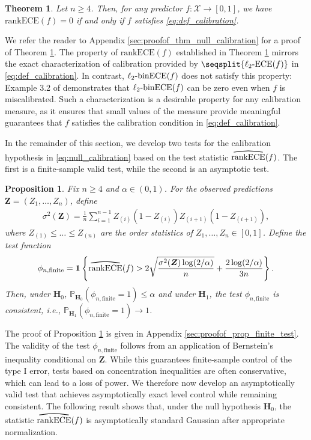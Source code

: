 \documentclass[11pt]{article}
\numberwithin{equation}{section}
\newtheorem{theorem}{Theorem}[section]
\newtheorem{proposition}{Proposition}[section]
\theoremstyle{definition}
\renewcommand{\P}{\mathbb{P}}
\newcommand{\cX}{\mathcal{X}}
\newcommand{\bZ}{\bm{Z}}
\newcommand{\one}{\bm{1}}
\newcommand{\myoverline}[2][3.5em]{%
  \overset{%
    \tikz[baseline=-0.1ex]{
      \draw[line width=0.75pt]
        (0,0) .. controls (#1/2,0.5ex) .. (#1,0);
    }%
  }{#2}%
}
\newcommand{\ECE}{\mathrm{ECE}}
\newcommand{\lECE}{\ell_2\textnormal{-}\ECE}
\newcommand{\binECE}{\mathrm{binECE}}
\newcommand{\lbinECE}{\ell_2\textnormal{-}\binECE}
\newcommand{\rankECE}{\mathrm{rankECE}}
\newcommand{\hatrankECE}{\myoverline{\rankECE}}
\begin{document}
\begin{theorem}\label{thm:null_calibration}
Let $n \geq 4$. Then, for any predictor $f:\cX \to [0,1]$, we have $\rankECE(f) = 0$ if and only if $f$ satisfies \eqref{eq:def_calibration}.
\end{theorem}

We refer the reader to Appendix \ref{sec:proofof_thm_null_calibration} for a proof of Theorem \ref{thm:null_calibration}. The property of $\rankECE(f)$ established in Theorem \ref{thm:null_calibration} mirrors the exact characterization of calibration provided by $\seqsplit{\lECE(f)}$ in \eqref{eq:def_calibration}. In contrast, $\lbinECE(f)$ does not satisfy this property: Example 3.2 of \citet{kumar2019verified} demonstrates that $\lbinECE(f)$ can be zero even when $f$ is miscalibrated. Such a characterization is a desirable property for any calibration measure, as it ensures that small values of the measure provide meaningful guarantees that $f$ satisfies the calibration condition in \eqref{eq:def_calibration}. 

In the remainder of this section, we develop two tests for the calibration hypothesis in \eqref{eq:null_calibration} based on the test statistic $\hatrankECE(f)$. The first is a finite-sample valid test, while the second is an asymptotic test.

\begin{proposition}\label{prop:finite_test}
    Fix $n\geq 4$ and $\alpha\in(0,1)$. For the observed predictions $\bZ=(Z_1,\ldots,Z_n)$, define
    \begin{align*}
        \sigma^2(\bZ)=\frac{1}{n}\sum_{i=1}^{n-1}
        Z_{(i)}(1-Z_{(i)})
        Z_{(i+1)}(1-Z_{(i+1)}),
    \end{align*}
    where $Z_{(1)}\leq \dots \leq Z_{(n)}$ are the order statistics of $Z_1,\dots,Z_n\in[0,1]$.
    Define the test function
    \begin{align*}
        \phi_{n,\mathrm{finite}}
        =
        \one\left\{
        \hatrankECE(f)>
        2\sqrt{\frac{\sigma^2(\bZ)\log(2/\alpha)}{n}}
        +\frac{2\log(2/\alpha)}{3n}
        \right\}.
    \end{align*}
    Then, under $\bm H_0$, $\P_{\bm H_0}\!\left(\phi_{n,\mathrm{finite}}=1\right)\leq\alpha$ and under $\bm H_1$, the test $\phi_{n,\mathrm{finite}}$ is consistent, i.e., $\P_{\bm H_1}\!\left(\phi_{n,\mathrm{finite}}=1\right)\to 1$.
\end{proposition}

The proof of Proposition \ref{prop:finite_test} is given in Appendix \ref{sec:proofof_prop_finite_test}. The validity of the test $\phi_{n,\mathrm{finite}}$ follows from an application of Bernstein's inequality conditional on $\bZ$. While this guarantees finite-sample control of the type I error, tests based on concentration inequalities are often conservative, which can lead to a loss of power. We therefore now develop an asymptotically valid test that achieves asymptotically exact level control while remaining consistent. The following result shows that, under the null hypothesis $\bm H_0$, the statistic $\hatrankECE(f)$ is asymptotically standard Gaussian after appropriate normalization.
\end{document}
